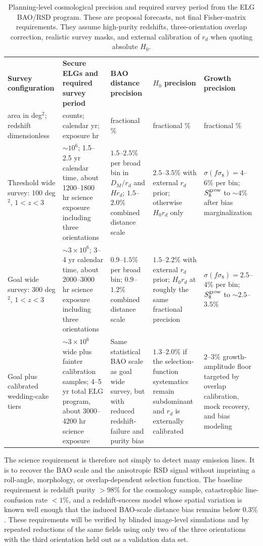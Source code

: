 \documentclass[10pt,onecolumn]{article}
\newcommand{\fsig}{f\sigma_8}
\newcommand{\degti}{deg$^2$}
\begin{document}
\begin{table}[tp]
\centering
\sffamily\small
\begin{tabularx}{\textwidth}{@{}p{3.0cm}p{2.2cm}p{2.4cm}p{2.8cm}Y@{}}
\toprule
\textbf{Survey configuration} & \textbf{Secure ELGs and required survey period} & \textbf{BAO distance precision} & \textbf{$H_0$ precision} & \textbf{Growth precision}\\
area in deg$^2$; redshift dimensionless & counts; calendar yr; exposure hr & fractional \% & fractional \% & fractional \%\\
\midrule
Threshold wide survey: 100 \degti, $1<z<3$ & $\sim10^6$; 1.5--2.5 yr calendar time, about 1200--1800 hr science exposure including three orientations & $1.5$--$2.5\%$ per broad bin in $D_M/r_d$ and $H r_d$; $1.5$--$2.0\%$ combined distance scale & $2.5$--$3.5\%$ with external $r_d$ prior; otherwise $H_0r_d$ only & $\sigma(\fsig)=4$--$6\%$ per bin; $S_8^{\rm grow}$ to $\sim4\%$ after bias marginalization\\
Goal wide survey: 300 \degti, $1<z<3$ & $\sim3\times10^6$; 3--4 yr calendar time, about 2000--3000 hr science exposure including three orientations & $0.9$--$1.5\%$ per broad bin; $0.9$--$1.2\%$ combined distance scale & $1.5$--$2.2\%$ with external $r_d$ prior; $H_0r_d$ at roughly the same fractional precision & $\sigma(\fsig)=2.5$--$4\%$ per bin; $S_8^{\rm grow}$ to $\sim2.5$--$3.5\%$\\
Goal plus calibrated wedding-cake tiers & $\sim3\times10^6$ wide plus fainter calibration samples; 4--5 yr total ELG program, about 3000--4200 hr science exposure & Same statistical BAO scale as goal wide survey, but with reduced redshift-failure and purity bias & $1.3$--$2.0\%$ if the selection-function systematics remain subdominant and $r_d$ is externally calibrated & $2$--$3\%$ growth-amplitude floor targeted by overlap calibration, mock recovery, and bias modeling\\
\bottomrule
\end{tabularx}
\caption{Planning-level cosmological precision and required survey period from the ELG BAO/RSD program. These are proposal forecasts, not final Fisher-matrix requirements. They assume high-purity redshifts, three-orientation overlap correction, realistic survey masks, and external calibration of $r_d$ when quoting absolute $H_0$.}
\label{tab:baoforecast}
\end{table}

The science requirement is therefore not simply to detect many emission lines. It is to recover the BAO scale and the anisotropic RSD signal without imprinting a roll-angle, morphology, or overlap-dependent selection function. The baseline requirement is redshift purity $>98\%$ for the cosmology sample, catastrophic line-confusion rate $<1\%$, and a redshift-success model whose spatial variation is known well enough that the induced BAO-scale distance bias remains below $0.3\%$. These requirements will be verified by blinded image-level simulations and by repeated reductions of the same fields using only two of the three orientations with the third orientation held out as a validation data set.
\end{document}
